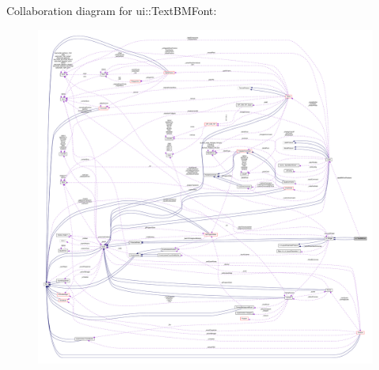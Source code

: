 Collaboration diagram for ui\+:\+:Text\+B\+M\+Font\+:
\nopagebreak
\begin{figure}[H]
\begin{center}
\leavevmode
\includegraphics[width=350pt]{classui_1_1TextBMFont__coll__graph}
\end{center}
\end{figure}

